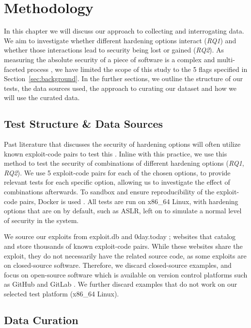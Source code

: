 \chapter{Methodology}

In this chapter we will discuss our approach to collecting and interrogating data. 
We aim to investigate whether different hardening options interact (\emph{RQ1}) and whether those interactions lead to security being lost or gained (\emph{RQ2}). 
As measuring the absolute security of a piece of software is a complex and multi-faceted process \citep{??}, we have limited the scope of this study to the 5 flags specified in Section~\ref{sec:background}. 
In the further sections, we outline the structure of our tests, the data sources used, the approach to curating our dataset and how we will use the curated data. 


\section{Test Structure \& Data Sources}

Past literature that discusses the security of hardening options will often utilize known exploit-code pairs to test this \citep{??}. 
Inline with this practice, we use this method to test the security of combinations of different hardening options (\emph{RQ1}, \emph{RQ2}). 
We use 5 exploit-code pairs for each of the chosen options, to provide relevant tests for each specific option, allowing us to investigate the effect of combinations afterwards.
To sandbox and ensure reproducibility of the exploit-code pairs, Docker is used \citep{??}. 
All tests are run on x86\_64 Linux, with hardening options that are on by default, such as ASLR, left on to simulate a normal level of security in the system. 

We source our exploits from exploit.db \citep{??} and 0day.today \citep{??}; websites that catalog and store thousands of known exploit-code pairs. 
While these websites share the exploit, they do not necessarily have the related source code, as some exploits are on closed-source software. 
Therefore, we discard closed-source examples, and focus on open-source software which is available on version control platforms such as GitHub \citep{??} and GitLab \citep{??}. 
We further discard examples that do not work on our selected test platform (x86\_64 Linux). 


\section{Data Curation}

